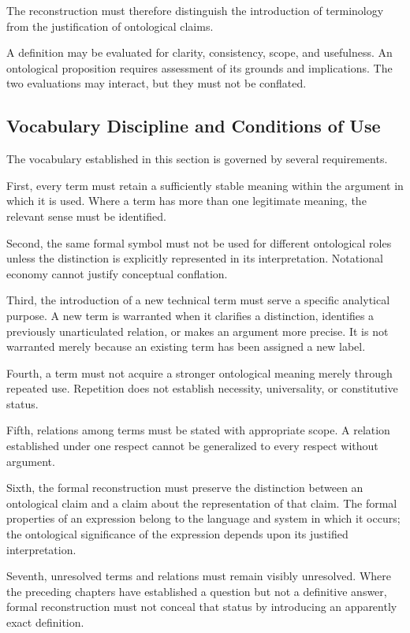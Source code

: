 The reconstruction must therefore distinguish
the introduction of terminology from the
justification of ontological claims.

A definition may be evaluated for clarity,
consistency, scope, and usefulness. An
ontological proposition requires assessment
of its grounds and implications. The two
evaluations may interact, but they must not
be conflated.

\subsection{Vocabulary Discipline and Conditions of Use}

The vocabulary established in this section
is governed by several requirements.

First, every term must retain a sufficiently
stable meaning within the argument in which
it is used. Where a term has more than one
legitimate meaning, the relevant sense must
be identified.

Second, the same formal symbol must not be
used for different ontological roles unless
the distinction is explicitly represented
in its interpretation. Notational economy
cannot justify conceptual conflation.

Third, the introduction of a new technical
term must serve a specific analytical purpose.
A new term is warranted when it clarifies
a distinction, identifies a previously
unarticulated relation, or makes an argument
more precise. It is not warranted merely
because an existing term has been assigned
a new label.

Fourth, a term must not acquire a stronger
ontological meaning merely through repeated
use. Repetition does not establish necessity,
universality, or constitutive status.

Fifth, relations among terms must be stated
with appropriate scope. A relation established
under one respect cannot be generalized to
every respect without argument.

Sixth, the formal reconstruction must preserve
the distinction between an ontological claim
and a claim about the representation of that
claim. The formal properties of an expression
belong to the language and system in which
it occurs; the ontological significance
of the expression depends upon its justified
interpretation.

Seventh, unresolved terms and relations must
remain visibly unresolved. Where the preceding
chapters have established a question but not
a definitive answer, formal reconstruction
must not conceal that status by introducing
an apparently exact definition.

